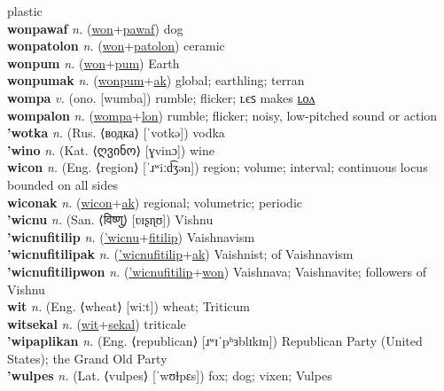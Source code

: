 plastic \label{wonkiolon} \\
\textbf{wonpawaf} \textit{n.} (\hyperref[won]{won}+\hyperref[pawaf]{pawaf})
dog \label{wonpawaf} \\
\textbf{wonpatolon} \textit{n.} (\hyperref[won]{won}+\hyperref[patolon]{patolon})
ceramic \label{wonpatolon} \\
\textbf{wonpum} \textit{n.} (\hyperref[won]{won}+\hyperref[pum]{pum})
Earth \label{wonpum} \\
\textbf{wonpumak} \textit{n.} (\hyperref[wonpum]{wonpum}+\hyperref[ak]{ak})
global; earthling; terran \label{wonpumak} \\
\textbf{wompa} \textit{v.} (ono. [wumba])
rumble; flicker; ʟєꜱ makes \hyperref[wompalon]{ʟᴏᴧ} \label{wompa} \\
\textbf{wompalon} \textit{n.} (\hyperref[wompa]{wompa}+\hyperref[lon]{lon})
rumble; flicker; noisy, low-pitched sound or action \label{wompalon} \\
\textbf{'wotka} \textit{n.} (Rus. ⟨водка⟩ [ˈvotkə])
vodka \label{'wotka} \\
\textbf{'wino} \textit{n.} (Kat. ⟨ღვინო⟩ [ɣvinɔ])
wine \label{'wino} \\
\textbf{wicon} \textit{n.} (Eng. ⟨region⟩ [ˈɹʷiːd͡ʒən])
region; volume; interval; continuous locus bounded on all sides \label{wicon} \\
\textbf{wiconak} \textit{n.} (\hyperref[wicon]{wicon}+\hyperref[ak]{ak})
regional; volumetric; periodic \label{wiconak} \\
\textbf{'wicnu} \textit{n.} (San. ⟨विष्णु⟩ [ʋɪʂɳʊ])
Vishnu \label{'wicnu} \\
\textbf{'wicnufitilip} \textit{n.} (\hyperref['wicnu]{'wicnu}+\hyperref[fitilip]{fitilip})
Vaishnavism \label{'wicnufitilip} \\
\textbf{'wicnufitilipak} \textit{n.} (\hyperref['wicnufitilip]{'wicnufitilip}+\hyperref[ak]{ak})
Vaishnist; of Vaishnavism \label{'wicnufitilipak} \\
\textbf{'wicnufitilipwon} \textit{n.} (\hyperref['wicnufitilip]{'wicnufitilip}+\hyperref[won]{won})
Vaishnava; Vaishnavite; followers of Vishnu \label{'wicnufitilipwon} \\
\textbf{wit} \textit{n.} (Eng. ⟨wheat⟩ [wiːt])
wheat; Triticum \label{wit} \\
\textbf{witsekal} \textit{n.} (\hyperref[wit]{wit}+\hyperref[sekal]{sekal})
triticale \label{witsekal} \\
\textbf{'wipaplikan} \textit{n.} (Eng. ⟨republican⟩ [ɹʷɪˈpʰɜblɪkɪn])
Republican Party (United States); the Grand Old Party \label{'wipaplikan} \\
\textbf{'wulpes} \textit{n.} (Lat. ⟨vulpes⟩ [ˈwʊɫpɛs])
fox; dog; vixen; Vulpes \label{'wulpes} \\
